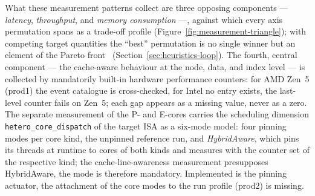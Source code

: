 \begin{nurkurz}
What these measurement patterns collect are three opposing components --- \emph{latency},
\emph{throughput}, and \emph{memory consumption} ---, against which every axis permutation spans as a
trade-off profile (Figure~\ref{fig:measurement-triangle}); with competing target quantities the
\enquote{best} permutation is no single winner but an element of the Pareto
front~\cite{ehrgott2005multicriteria} (Section~\ref{sec:heuristics-loop}). The fourth, central
component --- the cache-aware behaviour at the node, data, and index level --- is collected by
mandatorily built-in hardware performance counters: for AMD Zen~5 (prod1) the event catalogue is
cross-checked, for Intel no entry exists, the last-level counter fails on Zen~5; each gap appears as a
missing value, never as a zero. The separate measurement of the P- and E-cores carries the scheduling
dimension \texttt{hetero\_core\_dispatch} of the target ISA as a six-mode model: four pinning modes per
core kind, the unpinned reference run, and \emph{HybridAware}, which pins its threads at runtime to
cores of both kinds and measures with the counter set of the respective kind; the cache-line-awareness
measurement presupposes HybridAware, the mode is therefore mandatory. Implemented is the pinning
actuator, the attachment of the core modes to the run profile (prod2) is missing.
\begin{figure}[htbp]\centering
{}
\end{figure}
\end{nurkurz}
